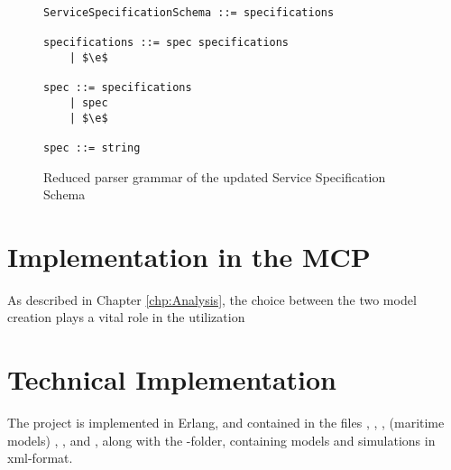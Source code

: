 \begin{figure}
	\centering
	\begin{lstlisting}[keywordstyle={}]
ServiceSpecificationSchema ::= specifications

specifications ::= spec specifications
    | $\e$
     
spec ::= specifications
    | spec
    | $\e$

spec ::= string
	\end{lstlisting}
	\caption{Reduced parser grammar of the updated Service Specification Schema}
	\label{fig:sSpecUpdRed}
\end{figure}

\section{Implementation in the MCP}
As described in Chapter \ref{chp:Analysis}, the choice between the two model creation plays a vital role in the utilization

\section{Technical Implementation}
The project is implemented in Erlang, and contained in the files , , , (maritime models) , , and , along with the -folder, containing models and simulations in xml-format.

